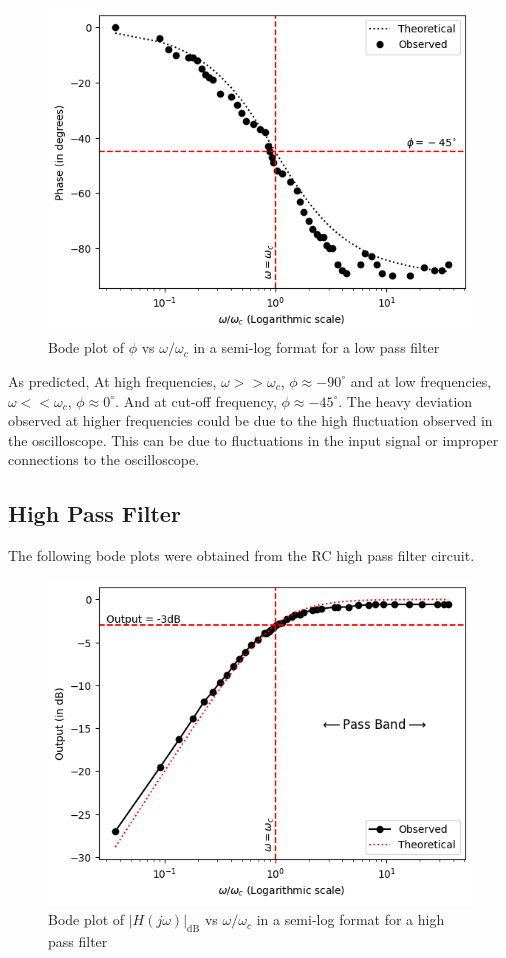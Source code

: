 \begin{figure}[H]
    \centering
    \includegraphics[width=0.9\columnwidth]{images/g2.png}
    \caption{Bode plot of $\phi$ vs $\omega/\omega_c$ in a semi-log format for a low pass filter}
    \label{graph:2}
\end{figure}


As predicted, At high frequencies, $\omega >> \omega_c$, $\phi \approx -90^{\circ}$ and at low frequencies, $\omega << \omega_c$, $\phi \approx 0^{\circ}$. And at cut-off frequency, $\phi \approx -45^{\circ}$. The heavy deviation observed at higher frequencies could be due to the high fluctuation observed in the oscilloscope. This can be due to fluctuations in the input signal or improper connections to the oscilloscope. 

\subsection*{High Pass Filter}
The following bode plots were obtained from the RC high pass filter circuit.

\begin{figure}[H]
    \centering
    \includegraphics[width=0.9\columnwidth]{images/g3.png}
    \caption{Bode plot of $|H(j\omega)|_\text{dB}$ vs $\omega/\omega_c$ in a semi-log format for a high pass filter}
    \label{graph:3}
\end{figure}

